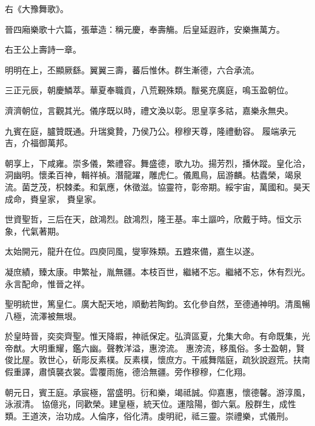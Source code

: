 \begin{pinyinscope}
 右《大豫舞歌》。



 晉四廂樂歌十六篇，張華造：稱元慶，奉壽觴。后皇延遐祚，安樂撫萬方。



 右王公上壽詩一章。



 明明在上，丕顯厥繇。翼翼三壽，蕃后惟休。群生漸德，六合承流。



 三正元辰，朝慶鱗萃。華夏奉職貢，八荒覲殊類。黻冕充廣庭，鳴玉盈朝位。



 濟濟朝位，言觀其光。儀序既以時，禮文渙以彰。思皇享多祜，嘉樂永無央。



 九賓在庭，臚贊既通。升瑞奠贄，乃侯乃公。穆穆天尊，隆禮動容。
 履端承元吉，介福御萬邦。



 朝享上，下咸雍。崇多儀，繁禮容。舞盛德，歌九功。揚芳烈，播休蹤。皇化洽，洞幽明。懷柔百神，輯祥禎。潛龍躍，雕虎仁。儀鳳鳥，屆游麟。枯蠹榮，竭泉流。菌芝茂，枳棘柔。和氣應，休徵滋。協靈符，彰帝期。綏宇宙，萬國和。昊天成命，賚皇家，
 賚皇家。



 世資聖哲，三后在天，啟鴻烈。啟鴻烈，隆王基。率土謳吟，欣戴于時。恒文示象，代氣著期。



 太始開元，龍升在位。四庾同風，燮寧殊類。五韙來備，嘉生以遂。



 凝庶績，臻太康。申繁祉，胤無疆。本枝百世，繼緒不忘。繼緒不忘，休有烈光。
 永言配命，惟晉之祥。



 聖明統世，篤皇仁。廣大配天地，順動若陶鈞。玄化參自然，至德通神明。清風暢八極，流澤被無垠。



 於皇時晉，奕奕齊聖。惟天降嘏，神祇保定。弘濟區夏，允集大命。有命既集，光帝猷。大明重耀，鑑六幽。聲教洋溢，惠滂流。
 惠滂流，移風俗。多士盈朝，賢俊比屋。敦世心，斫彫反素樸。反素樸，懷庶方。干戚舞階庭，疏狄說遐荒。扶南假重譯，肅慎襲衣裳。雲覆雨施，德洽無疆。旁作穆穆，仁化翔。



 朝元日，賓王庭。承宸極，當盛明。衍和樂，竭祗誠。仰嘉惠，懷德馨。游淳風，泳淑清。
 協億兆，同歡榮。建皇極，統天位。運陰陽，御六氣。殷群生，成性類。王道浹，治功成。人倫序，俗化清。虔明祀，祗三靈。崇禮樂，式儀刑。




\end{pinyinscope}
